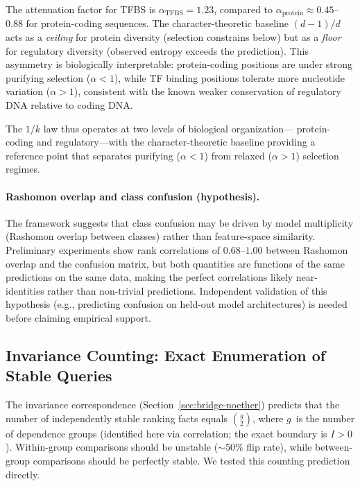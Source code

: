 \documentclass[11pt,a4paper]{article}
\begin{document}
The attenuation factor for TFBS is $\alpha_{\text{TFBS}} = 1.23$, compared
to $\alpha_{\text{protein}} \approx 0.45$--$0.88$ for protein-coding
sequences.  The character-theoretic baseline $(d{-}1)/d$ acts as a
\emph{ceiling} for protein diversity (selection constrains below) but as a
\emph{floor} for regulatory diversity (observed entropy exceeds the
prediction).  This asymmetry is biologically interpretable: protein-coding
positions are under strong purifying selection ($\alpha < 1$), while TF
binding positions tolerate more nucleotide variation ($\alpha > 1$),
consistent with the known weaker conservation of regulatory DNA relative
to coding DNA.

The $1/k$ law thus operates at two levels of biological organization---
protein-coding and regulatory---with the character-theoretic baseline
providing a reference point that separates purifying ($\alpha < 1$) from
relaxed ($\alpha > 1$) selection regimes.

\paragraph{Rashomon overlap and class confusion (hypothesis).}
\label{sec:confusion-rashomon}
The framework suggests that class confusion may be driven by model
multiplicity (Rashomon overlap between classes) rather than feature-space
similarity.  Preliminary experiments show rank correlations of $0.68$--$1.00$
between Rashomon overlap and the confusion matrix, but both quantities are
functions of the same predictions on the same data, making the perfect
correlations likely near-identities rather than non-trivial predictions.
Independent validation of this hypothesis (e.g., predicting confusion on
held-out model architectures) is needed before claiming empirical support.

\subsection{Invariance Counting: Exact Enumeration of Stable Queries}
\label{sec:noether-counting}

The invariance correspondence (Section~\ref{sec:bridge-noether}) predicts that
the number of independently stable ranking facts equals $\binom{g}{2}$, where
$g$~is the number of dependence groups (identified here via correlation; the exact boundary is $I > 0$).  Within-group comparisons should be
unstable ($\sim\!50\%$ flip rate), while between-group comparisons should be
perfectly stable.  We tested this counting prediction directly.
\end{document}
